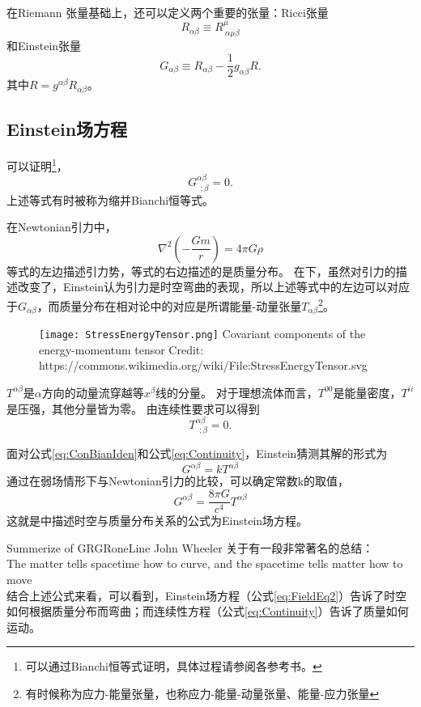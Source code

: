 在Riemann 张量基础上，还可以定义两个重要的张量：Ricci张量
\begin{equation}\label{eq:RicciTensor}
  R_{\alpha\beta} \equiv R^\mu_{~\alpha\mu\beta}
\end{equation}
和Einstein张量
\begin{equation}\label{eq:EinsteinTensor}
  G_{\alpha\beta} \equiv R_{\alpha\beta} -\frac{1}{2}g_{\alpha\beta}R.
\end{equation}
其中$R =g^{\alpha\beta}R_{\alpha\beta}$。

\subsection{Einstein场方程}

可以证明\footnote{可以通过Bianchi恒等式证明，具体过程请参阅各参考书。}，
\begin{equation}\label{eq:ConBianIden}
  G^{\alpha\beta}_{~~;\beta} =0.
\end{equation}
上述等式有时被称为缩并Bianchi恒等式。

在Newtonian引力中，
\begin{equation}\label{eq:NewtonPoisson}
  \nabla ^2 \left(-\frac{Gm}{r}\right) = 4\pi G \rho
\end{equation}
等式的左边描述引力势，等式的右边描述的是质量分布。
在\GR 下，虽然对引力的描述改变了，Einstein认为引力是时空弯曲的表现，所以上述等式中的左边可以对应于$G_{\alpha\beta}$，而质量分布在相对论中的对应是所谓能量-动量张量$T_{\alpha\beta}$\footnote{有时候称为应力-能量张量，也称应力-能量-动量张量、能量-应力张量}。
\begin{figure}[htp]
\centering
\texttt{[image: StressEnergyTensor.png]}
  {Covariant components of the energy-momentum tensor Credit: https://commons.wikimedia.org/wiki/File:StressEnergyTensor.svg}
\label{fig:ModGrav}
\end{figure}
$T^{\alpha\beta}$是$\alpha$方向的动量流穿越等$x^\beta$线的分量。
对于理想流体而言，$T^{00}$是能量密度，$T^{ii}$是压强，其他分量皆为零。
由连续性要求可以得到
\begin{equation}\label{eq:Continuity}
  T^{\alpha\beta}_{~~;\beta} =0.
\end{equation}
 
面对公式\ref{eq:ConBianIden}和公式\ref{eq:Continuity}，Einstein猜测其解的形式为
\begin{equation}\label{eq:FieldEq1}
  G^{\alpha\beta} =kT^{\alpha\beta}
\end{equation}
通过在弱场情形下与Newtonian引力的比较，可以确定常数k的取值，
\begin{equation}\label{eq:FieldEq2}
  G^{\alpha\beta} =\frac{8\pi G}{c^4}T^{\alpha\beta}
\end{equation}
这就是\GR 中描述时空与质量分布关系的公式为Einstein场方程。

\begin{myprop}{Summerize of GR}{GRoneLine}
John Wheeler 关于\GR 有一段非常著名的总结：\\
The matter tells spacetime how to curve, and the spacetime tells matter how to move\\
  结合上述公式来看，可以看到，Einstein场方程（公式\ref{eq:FieldEq2}）告诉了时空如何根据质量分布而弯曲；而连续性方程（公式\ref{eq:Continuity}）告诉了质量如何运动。
\end{myprop}
